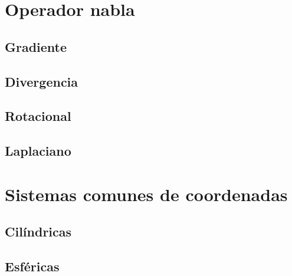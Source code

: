 \documentclass[12pt, fleqn]{report}                             %
\theoremstyle{break}                                            %
\begin{document}
        \section{Operador nabla}
        
            \subsection{Gradiente}
            
            \subsection{Divergencia}
            
            \subsection{Rotacional}
            
            \subsection{Laplaciano}
            
        \section{Sistemas comunes de coordenadas}
        
            \subsection{Cilíndricas}
            
            \subsection{Esféricas}
            
\end{document}
